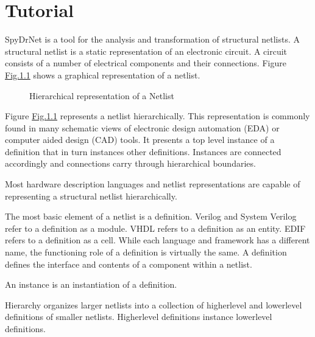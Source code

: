 \documentclass[letterpaper,10pt,english,openany,oneside]{sphinxmanual}
\begin{document}
\appendix
{}\label{\detokenize{tutorial::doc}}

\chapter{Tutorial}
\label{\detokenize{tutorial:tutorial}}
SpyDrNet is a tool for the analysis and transformation of structural netlists. A structural netlist is a static
representation of an electronic circuit. A circuit consists of a number of electrical components and their connections.
Figure \hyperref[\detokenize{tutorial:fig-hierarchical-netlist}]{Fig.\@ \ref{\detokenize{tutorial:fig-hierarchical-netlist}}} shows a graphical representation of a netlist.

\begin{figure}[H]
\centering
\capstart

\noindent{}
\caption{Hierarchical representation of a Netlist}\label{\detokenize{tutorial:id1}}\label{\detokenize{tutorial:fig-hierarchical-netlist}}\end{figure}

Figure \hyperref[\detokenize{tutorial:fig-hierarchical-netlist}]{Fig.\@ \ref{\detokenize{tutorial:fig-hierarchical-netlist}}} represents a netlist hierarchically. This representation is commonly found in
many schematic views of electronic design automation (EDA) or computer aided design (CAD) tools. It presents a top level
instance of a definition that in turn instances other definitions. Instances are connected accordingly and connections
carry through hierarchical boundaries.

Most hardware description languages and netlist representations are capable of representing a structural netlist
hierarchically.

The most basic element of a netlist is a definition. Verilog and System Verilog refer to a definition as
a module. VHDL refers to a definition as an entity. EDIF refers to a definition as a cell. While each language and
framework has a different name, the functioning role of a definition is virtually the same. A definition defines the
interface and contents of a component within a netlist.

An instance is an instantiation of a definition.

Hierarchy organizes larger netlists into
a collection of higher\sphinxhyphen{}level and lower\sphinxhyphen{}level definitions of smaller netlists. Higher\sphinxhyphen{}level definitions instance
lower\sphinxhyphen{}level definitions.
\end{document}
